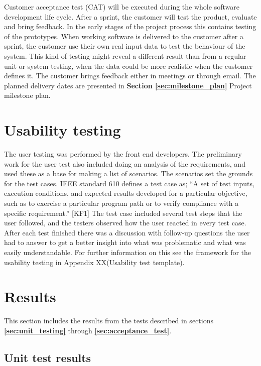 Customer acceptance test (CAT) will be executed during the whole software development life cycle. After a sprint, the customer will test the product, evaluate and bring feedback. In the early stages of the project process this contains testing of the prototypes. When working software is delivered to the customer after a sprint, the customer use their own real input data to test the behaviour of the system. This kind of testing might reveal a different result than from a regular unit or system testing, when the data could be more realistic when the customer defines it. The customer brings feedback either in meetings or through email. The planned delivery dates are presented in \textbf{Section \ref{sec:milestone_plan}} Project milestone plan.  

\section{Usability testing}

The user testing was performed by the front end developers. The preliminary work for the user test also included doing an analysis of the requirements, and used these as a base for making a list of scenarios. The scenarios set the grounds for the test cases. IEEE standard 610 defines a test case as; “A set of test inputs, execution conditions, and expected results developed for a particular objective, such as to exercise a particular program path or to verify compliance with a specific requirement.” [KF1] 
The test case included several test steps that the user followed, and the testers observed how the user reacted in every test case. After each test finished there was a discussion with follow-up questions the user had to answer to get a better insight into what was problematic and what was easily understandable. For further information on this see the framework for the usability testing in Appendix XX(Usability test template).

\section{Results}
\label{sec:test_results}

This section includes the results from the tests described in sections \textbf{\ref{sec:unit_testing}} through \textbf{\ref{sec:acceptance_test}}.

\subsection{Unit test results}

